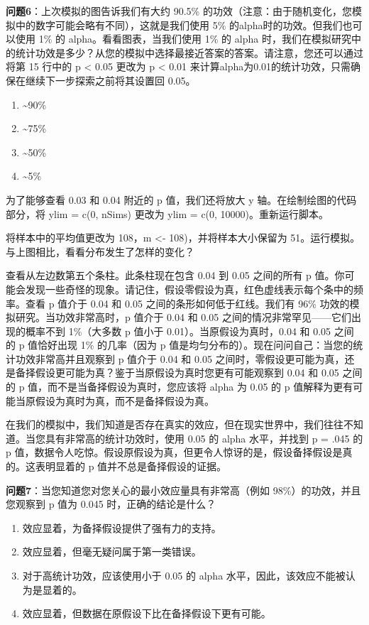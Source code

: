 \documentclass[
  letterpaper,
  DIV=11,
  numbers=noendperiod]{scrreprt}
\providecommand{\tightlist}{%
  \setlength{\itemsep}{0pt}\setlength{\parskip}{0pt}}\usepackage{longtable,booktabs,array}
\begin{document}
\textbf{问题6}：上次模拟的图告诉我们有大约 90.5\%
的功效（注意：由于随机变化，您模拟中的数字可能会略有不同），这就是我们使用
5\% 的alpha时的功效。但我们也可以使用 1\% 的 alpha。看看图表，当我们使用
1\% 的 alpha
时，我们在模拟研究中的统计功效是多少？从您的模拟中选择最接近答案的答案。请注意，您还可以通过将第
15 行中的 p \textless{} 0.05 更改为 p \textless{} 0.01
来计算alpha为0.01的统计功效，只需确保在继续下一步探索之前将其设置回
0.05。

\begin{enumerate}
\def\labelenumi{\Alph{enumi})}
\tightlist
\item
  \textasciitilde90\%
\item
  \textasciitilde75\%
\item
  \textasciitilde50\%
\item
  \textasciitilde5\%
\end{enumerate}

为了能够查看 0.03 和 0.04 附近的 p 值，我们还将放大 y
轴。在绘制绘图的代码部分，将 ylim = c(0, nSims) 更改为 ylim = c(0,
10000)。重新运行脚本。

将样本中的平均值更改为 108，m \textless- 108)，并将样本大小保留为
51。运行模拟。与上图相比，看看分布发生了怎样的变化？

查看从左边数第五个条柱。此条柱现在包含 0.04 到 0.05 之间的所有 p
值。你可能会发现一些奇怪的现象。请记住，假设零假设为真，红色虚线表示每个条中的频率。查看
p 值介于 0.04 和 0.05 之间的条形如何低于红线。我们有 96\%
功效的模拟研究。当功效非常高时，p 值介于 0.04 和 0.05
之间的情况非常罕见------它们出现的概率不到 1\%（大多数 p 值小于
0.01）。当原假设为真时，0.04 和 0.05 之间的 p 值恰好出现 1\%
的几率（因为 p
值是均匀分布的）。现在问问自己：当您的统计功效非常高并且观察到 p 值介于
0.04 和 0.05
之间时，零假设更可能为真，还是备择假设更可能为真？鉴于当原假设为真时您更有可能观察到
0.04 和 0.05 之间的 p 值，而不是当备择假设为真时，您应该将 alpha 为 0.05
的 p 值解释为更有可能当原假设为真时为真，而不是备择假设为真。

在我们的模拟中，我们知道是否存在真实的效应，但在现实世界中，我们往往不知道。当您具有非常高的统计功效时，使用
0.05 的 alpha 水平，并找到 p = .045 的 p
值，数据令人吃惊。假设原假设为真，但更令人惊讶的是，假设备择假设是真的。这表明显着的
p 值并不总是备择假设的证据。

\textbf{问题7}：当您知道您对您关心的最小效应量具有非常高（例如
98\%）的功效，并且您观察到 p 值为 0.045 时，正确的结论是什么？

\begin{enumerate}
\def\labelenumi{\Alph{enumi})}
\tightlist
\item
  效应显着，为备择假设提供了强有力的支持。
\item
  效应显着，但毫无疑问属于第一类错误。
\item
  对于高统计功效，应该使用小于 0.05 的 alpha
  水平，因此，该效应不能被认为是显着的。
\item
  效应显着，但数据在原假设下比在备择假设下更有可能。
\end{enumerate}
\end{document}
